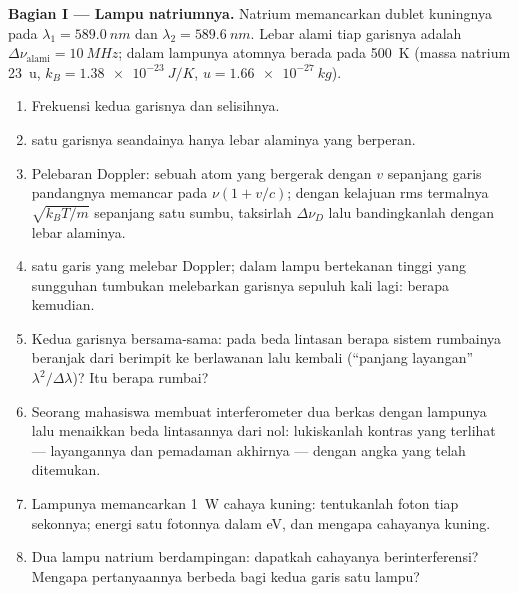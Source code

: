 \begin{problem}
\label{pb:b2:scalar-light-model:1}

\medskip
\noindent\textbf{Bagian I --- Lampu natriumnya.}
Natrium memancarkan dublet kuningnya pada $\lambda_1 = \qty{589.0}{nm}$ dan $\lambda_2 =
\qty{589.6}{nm}$. Lebar alami tiap garisnya adalah $\Delta\nu_{\text{alami}} =
\qty{10}{MHz}$; dalam lampunya atomnya berada pada \qty{500}{K} (massa natrium
\qty{23}{u}, $k_B = \qty{1.38e-23}{J/K}$, $u = \qty{1.66e-27}{kg}$).
\begin{enumerate}
  \item Frekuensi kedua garisnya dan selisihnya.
  \item {} satu garisnya seandainya hanya lebar alaminya
        yang berperan.
  \item Pelebaran Doppler: sebuah atom yang bergerak dengan $v$ sepanjang garis
        pandangnya memancar pada $\nu(1 + v/c)$; dengan kelajuan rms termalnya $\sqrt{k_BT
        /m}$ sepanjang satu sumbu, taksirlah $\Delta\nu_D$ lalu bandingkanlah dengan
        lebar alaminya.
  \item {} satu garis yang melebar Doppler; dalam lampu
        bertekanan tinggi yang sungguhan tumbukan melebarkan garisnya sepuluh kali
        lagi: berapa  kemudian.
  \item Kedua garisnya bersama-sama: pada beda lintasan berapa sistem
        rumbainya beranjak dari berimpit ke berlawanan lalu kembali
        (``panjang layangan'' $\lambda^2/\Delta\lambda$)? Itu berapa rumbai?
  \item Seorang mahasiswa membuat interferometer dua berkas dengan lampunya lalu
        menaikkan beda lintasannya dari nol: lukiskanlah
        kontras yang terlihat --- layangannya dan pemadaman akhirnya --- dengan
        angka yang telah ditemukan.
  \item Lampunya memancarkan \qty{1}{W} cahaya kuning: tentukanlah foton tiap sekonnya;
        energi satu fotonnya dalam eV, dan mengapa cahayanya kuning.
  \item Dua lampu natrium berdampingan: dapatkah cahayanya berinterferensi?
        Mengapa pertanyaannya berbeda bagi kedua garis satu lampu?
\end{enumerate}


\end{problem}
